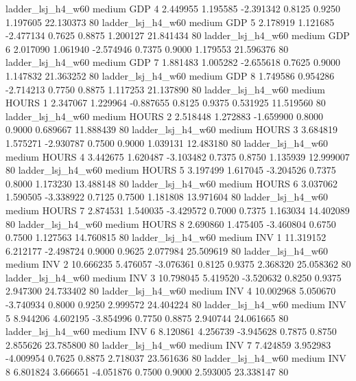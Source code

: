      ladder_lsj_h4_w60     medium      GDP                 4  2.449955 1.195585 -2.391342 0.8125 0.9250  1.197605   22.130373 80
     ladder_lsj_h4_w60     medium      GDP                 5  2.178919 1.121685 -2.477134 0.7625 0.8875  1.200127   21.841434 80
     ladder_lsj_h4_w60     medium      GDP                 6  2.017090 1.061940 -2.574946 0.7375 0.9000  1.179553   21.596376 80
     ladder_lsj_h4_w60     medium      GDP                 7  1.881483 1.005282 -2.655618 0.7625 0.9000  1.147832   21.363252 80
     ladder_lsj_h4_w60     medium      GDP                 8  1.749586 0.954286 -2.714213 0.7750 0.8875  1.117253   21.137890 80
     ladder_lsj_h4_w60     medium    HOURS                 1  2.347067 1.229964 -0.887655 0.8125 0.9375  0.531925   11.519560 80
     ladder_lsj_h4_w60     medium    HOURS                 2  2.518448 1.272883 -1.659900 0.8000 0.9000  0.689667   11.888439 80
     ladder_lsj_h4_w60     medium    HOURS                 3  3.684819 1.575271 -2.930787 0.7500 0.9000  1.039131   12.483180 80
     ladder_lsj_h4_w60     medium    HOURS                 4  3.442675 1.620487 -3.103482 0.7375 0.8750  1.135939   12.999007 80
     ladder_lsj_h4_w60     medium    HOURS                 5  3.197499 1.617045 -3.204526 0.7375 0.8000  1.173230   13.488148 80
     ladder_lsj_h4_w60     medium    HOURS                 6  3.037062 1.590505 -3.338922 0.7125 0.7500  1.181808   13.971604 80
     ladder_lsj_h4_w60     medium    HOURS                 7  2.874531 1.540035 -3.429572 0.7000 0.7375  1.163034   14.402089 80
     ladder_lsj_h4_w60     medium    HOURS                 8  2.690860 1.475405 -3.460804 0.6750 0.7500  1.127563   14.760815 80
     ladder_lsj_h4_w60     medium      INV                 1 11.319152 6.212177 -2.498724 0.9000 0.9625  2.077984   25.509619 80
     ladder_lsj_h4_w60     medium      INV                 2 10.666235 5.476057 -3.076361 0.8125 0.9375  2.368320   25.058362 80
     ladder_lsj_h4_w60     medium      INV                 3 10.798045 5.419520 -3.520632 0.8250 0.9375  2.947300   24.733402 80
     ladder_lsj_h4_w60     medium      INV                 4 10.002968 5.050670 -3.740934 0.8000 0.9250  2.999572   24.404224 80
     ladder_lsj_h4_w60     medium      INV                 5  8.944206 4.602195 -3.854996 0.7750 0.8875  2.940744   24.061665 80
     ladder_lsj_h4_w60     medium      INV                 6  8.120861 4.256739 -3.945628 0.7875 0.8750  2.855626   23.785800 80
     ladder_lsj_h4_w60     medium      INV                 7  7.424859 3.952983 -4.009954 0.7625 0.8875  2.718037   23.561636 80
     ladder_lsj_h4_w60     medium      INV                 8  6.801824 3.666651 -4.051876 0.7500 0.9000  2.593005   23.338147 80
